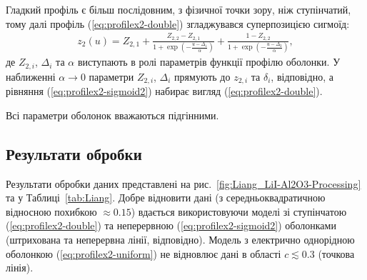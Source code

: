 \documentclass[14pt,twoside]{vakthesis}
\begin{document}
Гладкий профіль є більш послідовним, з фізичної точки зору, ніж ступінчатий, тому далі профіль (\ref{eq:profilex2-double}) згладжувався суперпозицією сигмоїд:
\begin{equation}\label{eq:profilex2-sigmoid2}
\begin{split}
{z}_2 (u) = {Z}_{2,1} 
+ \frac{{Z}_{2,2} - {Z}_{2,1}}{1 + \exp{\left( - \frac{u - \Delta_1}{\alpha} \right)}}  + \frac{1 - {Z}_{2,2}}{1 + \exp{\left( - \frac{u - \Delta_2}{\alpha} \right)}},
\end{split}
\end{equation}
де ${Z}_{2,i}$, $\Delta_{i}$ та $\alpha$ виступають в ролі параметрів функції профілю оболонки. У наближенні $\alpha \to 0$ параметри ${Z}_{2,i}$, $\Delta_{i}$ прямують до ${z}_{2,i}$ та $\delta_i$, відповідно, а рівняння (\ref{eq:profilex2-sigmoid2}) набирає вигляд (\ref{eq:profilex2-double}). 

Всі параметри оболонок вважаються підгінними.

\subsection{Результати обробки}

Результати обробки даних \cite{Liang1973} представлені на рис.~\ref{fig:Liang_LiI-Al2O3-Processing} та у Таблиці~\ref{tab:Liang}. 
Добре відновити дані {\color{violet}(з середньоквадратичною відносною похибкою $\approx 0.15$)}  вдається використовуючи моделі зі ступінчатою (\ref{eq:profilex2-double}) та неперервною (\ref{eq:profilex2-sigmoid2}) оболонками (штрихована та неперервна лінії, відповідно).
Модель з електрично однорідною оболонкою (\ref{eq:profilex2-uniform}) не відновлює дані в області $c \lesssim 0.3$ (точкова лінія).
\end{document}
